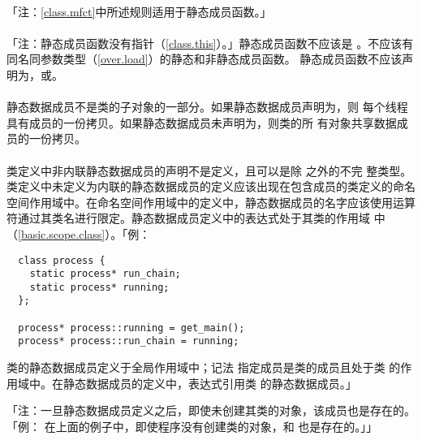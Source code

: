 \paragraph{}
「注：\ref{class.mfct}中所述规则适用于静态成员函数。」

\paragraph{}
「注：静态成员函数没有指针（\ref{class.this}）。」静态成员函数不应该是
。不应该有同名同参数类型（\ref{over.load}）的静态和非静态成员函数。
静态成员函数不应该声明为，或。

\paragraph{}
静态数据成员不是类的子对象的一部分。如果静态数据成员声明为，则
每个线程具有成员的一份拷贝。如果静态数据成员未声明为，则类的所
有对象共享数据成员的一份拷贝。

\paragraph{}
类定义中非内联静态数据成员的声明不是定义，且可以是除 之外的不完
整类型。类定义中未定义为内联的静态数据成员的定义应该出现在包含成员的类定义的命名
空间作用域中。在命名空间作用域中的定义中，静态数据成员的名字应该使用\tm{::}运算
符通过其类名进行限定。静态数据成员定义中的表达式处于其类的作用域
中（\ref{basic.scope.class}）。「例：
\begin{lstlisting}
  class process {
    static process* run_chain;
    static process* running;
  };

  process* process::running = get_main();
  process* process::run_chain = running;
\end{lstlisting}
类的静态数据成员定义于全局作用域中；记法
指定成员是类的成员且处于类
的作用域中。在静态数据成员的定义中，表达式引用类
的静态数据成员。」

「注：一旦静态数据成员定义之后，即使未创建其类的对象，该成员也是存在的。「例：
在上面的例子中，即使程序没有创建类的对象，和
也是存在的。」」

